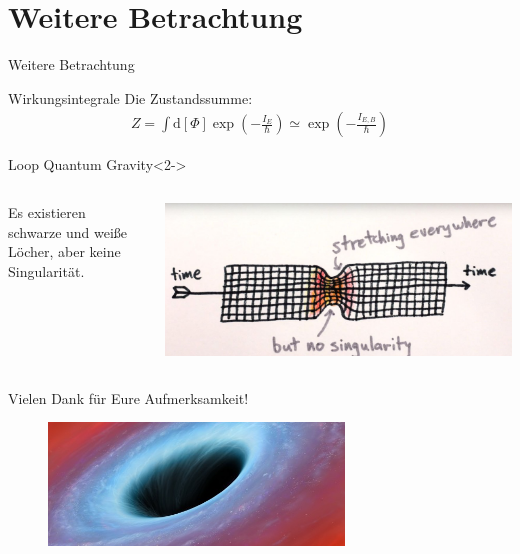 \documentclass[ngerman,ph]{URbeamer}
\newcommand{\diff}{\mathrm{d}}
\begin{document}
	\section{Weitere Betrachtung}
	\begin{frame}{Weitere Betrachtung}
		\begin{block}{Wirkungsintegrale}
		Die Zustandssumme: 
			\begin{align*}
			Z = \int \diff [\Phi] \exp \left(- \frac{I_E}{\hbar}\right) 
			\simeq \exp \left(- \frac{I_{E,B}}{\hbar}\right)
			\end{align*}
		\end{block}
		\begin{block}{Loop Quantum Gravity}<2->
			\begin{columns}
				\begin{column}[c]{0.45\textwidth}
					Es existieren schwarze und weiße Löcher, aber keine Singularität.
				\end{column}
				\begin{column}[c]{0.45\textwidth}
					\hfill
					\includegraphics[width=\textwidth]{bounce1}
				\end{column} %
			\end{columns}
		\end{block} 
	\end{frame}	
	
	\begin{frame}
		\begin{minipage}[c]{\textwidth}
			\huge{Vielen Dank für Eure Aufmerksamkeit!}
		\end{minipage}	
		\begin{figure} [h] 
			\begin{center}
				\includegraphics[width=0.7\textwidth]{n-117451542-large570}
			\end{center}
		\end{figure}	
	\end{frame}
\end{document}
